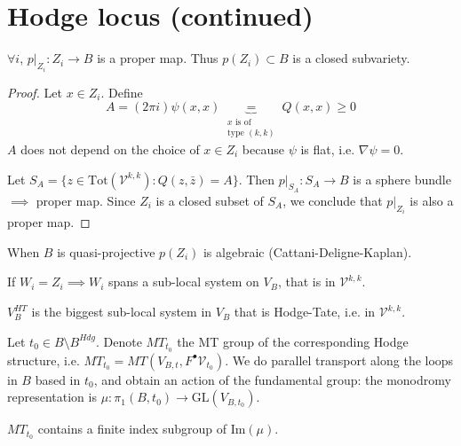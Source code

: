 \section{Hodge locus (continued)}
\label{section-hodge-locus-cont}

\begin{proposition}
\label{proposition-proper}
$\forall  i$, $p|_{Z_i}:Z_i \to B$
is a proper map.
Thus $p(Z_i)\subset B$ is a closed
subvariety.
\end{proposition}

\begin{proof}
Let $x \in Z_i$.
Define
$$
A=(2\pi i) \psi(x,x)
\underbrace{=}_{\substack{\text{$x$ is of} \\
\text{type $(k,k)$}}}
Q(x,x)\geq 0
$$
$A$ does not depend on the choice of $x \in
Z_i$
because $\psi$ is flat, i.e. $\nabla \psi=0$.

Let $S_A=\{z \in
\text{Tot}(\mathcal{V}^{k,k})
:Q(z,\bar{z})=A\}$.
Then $p|_{S_A}:S_A \to B$
is a sphere bundle $\implies $ proper map.
Since $Z_i$ is a closed subset of $S_A$,
we conclude that $p|_{Z_i}$ is also a proper
map.
\end{proof}

\begin{remark}
\label{remark-quasi-projective}
When $B$ is quasi-projective
$p(Z_i)$ is algebraic
(Cattani-Deligne-Kaplan).
\end{remark}

\noindent
If $W_i=Z_i \implies W_i$ spans
a sub-local system on $V_B$,
that is in  $\mathcal{V}^{k,k}$.

\begin{definition}
\label{definition-hodge-tate-local-system}
$V_B^{HT}$ is the biggest sub-local system in
$V_B$
that is Hodge-Tate, i.e. in
$\mathcal{V}^{k,k}$.
\end{definition}

\noindent
Let $t_0 \in B\setminus B^{Hdg}$.
Denote $MT_{t_0}$ the MT group of the
corresponding Hodge structure,
i.e.
$MT_{t_0}=MT(V_{B,t},F^\bullet\mathcal{V}
_{t_0})$.
We do parallel transport along the loops in
$B$ based in $t_0$,
and obtain an action of the fundamental
group:
the monodromy representation is
$\mu:\pi_1(B,t_0) \to \text{GL}(V_{B,t_0})$.

\begin{proposition}
\label{proposition-monodromy}
$MT_{t_0}$ contains a finite index subgroup
of $\text{Im}(\mu)$.
\end{proposition}

